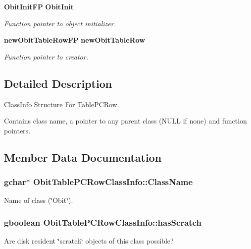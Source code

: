 \begin{CompactItemize}
{\bf Obit\-Init\-FP} {\bf Obit\-Init}
\begin{CompactList}\small\item\em Function pointer to object initializer. \item\end{CompactList}\item 
{\bf new\-Obit\-Table\-Row\-FP} {\bf new\-Obit\-Table\-Row}
\begin{CompactList}\small\item\em Function pointer to creator. \item\end{CompactList}\end{CompactItemize}


\subsection{Detailed Description}
Class\-Info Structure For Table\-PCRow. 

Contains class name, a pointer to any parent class (NULL if none) and function pointers. 



\subsection{Member Data Documentation}
\subsubsection{\setlength{\rightskip}{0pt plus 5cm}gchar$\ast$ {\bf Obit\-Table\-PCRow\-Class\-Info::Class\-Name}}\label{structObitTablePCRowClassInfo_o2}


Name of class (\char`\"{}Obit\char`\"{}). 

\subsubsection{\setlength{\rightskip}{0pt plus 5cm}gboolean {\bf Obit\-Table\-PCRow\-Class\-Info::has\-Scratch}}\label{structObitTablePCRowClassInfo_o1}


Are disk resident \char`\"{}scratch\char`\"{} objects of this class possible? 

